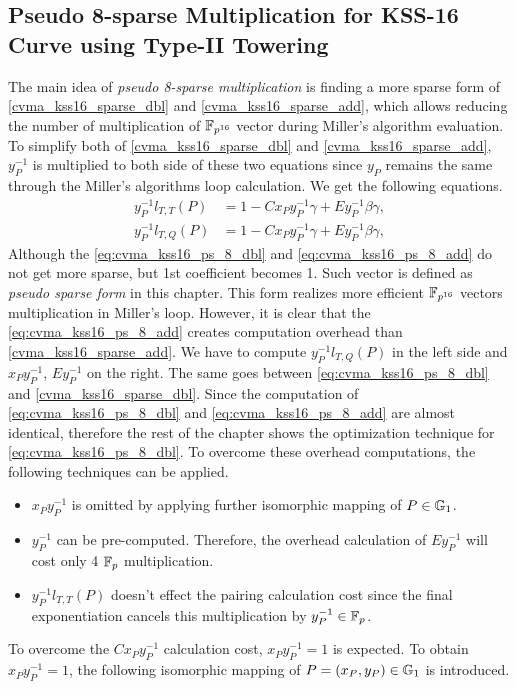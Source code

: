 \subsection{Pseudo 8-sparse Multiplication for KSS-16 Curve using Type-II Towering}
The main idea of  \textit{pseudo 8-sparse multiplication} is finding a more sparse form  of \eqref{cvma_kss16_sparse_dbl} and \eqref{cvma_kss16_sparse_add}, which allows reducing the number of multiplication of $\mathbb{F}_{p^{16}}$ vector during Miller's algorithm evaluation. 
To simplify both of \eqref{cvma_kss16_sparse_dbl} and \eqref{cvma_kss16_sparse_add}, $y_P^{-1}$ is multiplied to both side of  these two equations since $y_P$  remains the same through the Miller's algorithms loop calculation.
We get the following equations.
\begin{subequations}
	\begin{eqnarray}
	y_{P}^{-1}l_{T,T}(P)& =  1 -Cx_{P}y_{P}^{-1}\gamma+E y_{P}^{-1}\beta\gamma ,  \label{eq:cvma_kss16_ps_8_dbl}\\
	y_{P}^{-1}l_{T,Q}(P)& =  1 -Cx_{P}y_{P}^{-1}\gamma+E y_{P}^{-1}\beta\gamma , \label{eq:cvma_kss16_ps_8_add}
	\end{eqnarray}
\end{subequations}
Although the \eqref{eq:cvma_kss16_ps_8_dbl} and \eqref{eq:cvma_kss16_ps_8_add} do not get more sparse, but 1st coefficient becomes 1. 
Such vector is defined as \textit{pseudo sparse form} in this chapter. 
This form realizes more efficient $\mathbb{F}_{p^{16}}$ vectors  multiplication in Miller's loop.  
However, it is clear that the \eqref{eq:cvma_kss16_ps_8_add} creates computation overhead than \eqref{cvma_kss16_sparse_add}. We have to compute $y_{P}^{-1}l_{T,Q}(P)$ in the left side and $x_Py_{P}^{-1}$, $Ey_P^{-1}$ on the right. 
The same goes between \eqref{eq:cvma_kss16_ps_8_dbl} and \eqref{cvma_kss16_sparse_dbl}. 
Since the computation of \eqref{eq:cvma_kss16_ps_8_dbl} and \eqref{eq:cvma_kss16_ps_8_add} are almost identical, therefore the rest of the chapter shows the optimization technique for \eqref{eq:cvma_kss16_ps_8_dbl}.
To overcome these overhead computations, the following techniques can be applied.
\begin{itemize}
	\item $x_{P}y_{P}^{-1}$ is omitted by applying further isomorphic mapping of $P \in {\mathbb{G}}_{1}$.
	\item  $y_P^{-1} $ can be pre-computed. Therefore, the overhead calculation of $Ey_P^{-1}$ will cost only 4 ${\mathbb{F}}_{p}$ multiplication.
	\item  $y_{P}^{-1}l_{T,T}(P)$  doesn't effect the pairing calculation cost since the final exponentiation cancels this multiplication by $y_{P}^{-1} \in {\mathbb{F}}_{p}$.
\end{itemize}
To overcome the $Cx_{P}y_{P}^{-1}$  calculation cost, $x_{P}y_{P}^{-1} =1 $ is expected. 
To obtain $x_{P}y_{P}^{-1} = 1$, the following isomorphic mapping of $P=(x_P,y_P) \in {\mathbb{G}}_{1}$ is introduced. 

